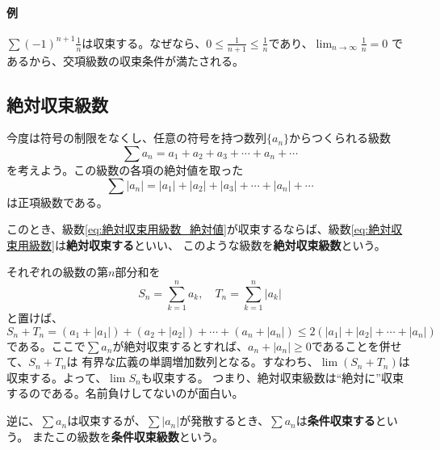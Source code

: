 \documentclass[a4j,dvipdfmx]{jsarticle}
\begin{document}
                \paragraph{例}$\displaystyle\sum (-1)^{n+1}\frac{1}{n}$は収束する。なぜなら、$\displaystyle 0\leq \frac{1}{n+1}\leq \frac{1}{n}$であり、$\displaystyle\lim_{n\to \infty}\frac{1}{n}=0$
                であるから、交項級数の収束条件が満たされる。
            \clearpage
            \subsection{絶対収束級数}
                今度は符号の制限をなくし、任意の符号を持つ数列$\{a_n\}$からつくられる級数
                \begin{equation*}
                    \sum a_n = a_1+a_2+a_3+\cdots+a_n+\cdots \label{eq:絶対収束用級数}
                \end{equation*}
                を考えよう。この級数の各項の絶対値を取った
                \begin{equation*}
                    \sum |a_n| = |a_1|+|a_2|+|a_3|+\cdots+|a_n|+\cdots\label{eq:絶対収束用級数_絶対値}
                \end{equation*}
                は正項級数である。

                このとき、級数\eqref{eq:絶対収束用級数_絶対値}が収束するならば、級数\eqref{eq:絶対収束用級数}は\textbf{絶対収束する}といい、
                このような級数を\textbf{絶対収束級数}という。

                それぞれの級数の第$n$部分和を
                \begin{equation*}
                    S_n = \sum_{k=1}^{n}a_k,\quad T_n = \sum_{k=1}^{n}|a_k|
                \end{equation*}
                と置けば、
                \begin{equation*}
                    S_n+T_n=(a_1+|a_1|)+(a_2+|a_2|)+\cdots+(a_n+|a_n|)\leq 2(|a_1|+|a_2|+\cdots+|a_n|)
                \end{equation*}
                である。ここで$\sum a_n$が絶対収束するとすれば、$a_n+|a_n|\geq 0$であることを併せて、$S_n+T_n$は
                有界な広義の単調増加数列となる。すなわち、$\lim (S_n+T_n)$は収束する。よって、$\lim S_n$も収束する。
                つまり、絶対収束級数は``絶対に''収束するのである。名前負けしてないのが面白い。

                逆に、$\sum a_n$は収束するが、$\sum|a_n|$が発散するとき、$\sum a_n$は\textbf{条件収束する}という。
                またこの級数を\textbf{条件収束級数}という。\\
\end{document}
